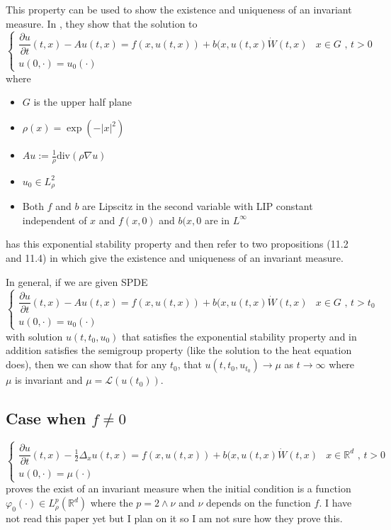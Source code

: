 \documentclass[a4paper,11pt]{article}
\theoremstyle{plain}
\theoremstyle{definition}
\newcommand{\R}{\mathbb{R}}
\numberwithin{NQ}{section}
\numberwithin{LQ}{section}
\numberwithin{ZQ}{section}
\begin{document}
This property can be used to show the existence and uniqueness of an invariant measure. In \cite{MSY16}, they show that the solution to 
$$ \begin{cases}
 \dfrac{\partial u}{\partial t}(t,x)- Au(t,x) = f(x,u(t,x)) + b(x,u(t,x)\dot W(t,x) & \text{$x\in G$ , $t>0$}
 \\ u(0,\cdot) = u_0(\cdot)  & 
 \end{cases} $$
 where 
 \begin{itemize}
     \item $G$ is the upper half plane 
     \item $\rho(x) = \exp(-|x|^2)$ 
     \item $Au := \frac{1}{\rho}\text{div}(\rho \nabla u)$
     \item $u_0 \in L^2_\rho$
     \item Both $f$ and $b$ are Lipscitz in the second variable with LIP constant independent of $x$ and $f(x,0)$ and $b(x,0$ are in $L^\infty$ 
 \end{itemize}
 has this exponential stability property and then refer to two propositions (11.2 and 11.4) in \cite{DZ92} which give the existence and uniqueness of an invariant measure. 
 
 In general, if we are given SPDE 
 $$ \begin{cases}
 \dfrac{\partial u}{\partial t}(t,x)- Au(t,x) = f(x,u(t,x)) + b(x,u(t,x)\dot W(t,x) & \text{$x\in G$ , $t>t_0$}
 \\ u(0,\cdot) = u_0(\cdot)  & 
 \end{cases} $$
 with solution $u(t,t_0,u_0)$ that satisfies the exponential stability property and in addition satisfies the semigroup property (like the solution to the heat equation does), then we can show that for any $t_0$, that $u(t,t_0,u_{t_0}) \to \mu$ as $t \to \infty$ where $\mu$ is invariant and $\mu = \mathscr L (u(t_0))$.


\subsection{Case when $f \not = 0$}
$$ \begin{cases}
 \dfrac{\partial u}{\partial t}(t,x)- \frac{1}{2}\Delta_xu(t,x) = f(x,u(t,x)) + b(x,u(t,x)\dot W(t,x) & \text{$x\in \R^d$ , $t>0$}
 \\ u(0,\cdot) = \mu(\cdot)  & 
 \end{cases} $$
\cite{AM03} proves the exist of an invariant measure when the initial condition is a function $\varphi_0(\cdot) \in L^p_\rho(\R^d)$ where the $p=2\wedge \nu$ and $\nu$ depends on the function $f$. I have not read this paper yet but I plan on it so I am not sure how they prove this. 
\end{document}
